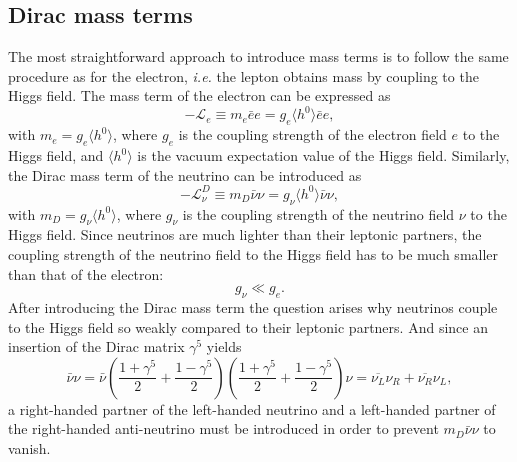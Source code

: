 \subsection{Dirac mass terms}
\label{sec:dirac}
The most straightforward approach to introduce mass terms is to follow the same procedure as for the electron, \textit{i.e.} the lepton obtains mass by coupling to the Higgs field. The mass term of the electron can be expressed as
\begin{equation}
  \label{eq:dme}
  -\mathcal{L}_{e} \equiv m_{e}\bar{e}e = g_{e}\langle      
  h^{0}\rangle \bar{e}e,
\end{equation}
with $m_{e} = g_{e} \langle h^{0}\rangle$, where $g_e$ is the coupling strength of the electron field $e$ to the Higgs field, and $\langle h^{0} \rangle$ is the vacuum expectation value of the Higgs field. Similarly, the Dirac mass term of the neutrino can be introduced as
\begin{equation}
\label{eq:dmnu}
-\mathcal{L}_{\nu}^{D} \equiv m_{D}\bar{\nu}\nu = g_{\nu} \langle h^{0} \rangle \bar{\nu}\nu,
\end{equation}
with $m_{D} = g_{\nu} \langle h^{0}\rangle$, where $g_\nu$ is the coupling strength of the neutrino field $\nu$ to the Higgs field. Since neutrinos are much lighter than their leptonic partners, the coupling strength of the neutrino field to the Higgs field has to be much smaller than that of the electron:
\begin{equation}
  \label{eq:gg}
  g_{\nu} \ll g_{e}.
\end{equation}
After introducing the Dirac mass term the question arises why neutrinos couple to the Higgs field so weakly compared to their leptonic partners. And since an insertion of the Dirac matrix $\gamma^{5}$ yields
\begin{equation}
  \label{eq:2psi}
  \bar{\nu}\nu = \bar{\nu}    
  \left(\frac{1+\gamma^5}{2}+\frac{1-\gamma^5}{2}\right)
  \left(\frac{1+\gamma^5}{2}+\frac{1-\gamma^5}{2}\right) \nu =
  \overline{\nu_{L}}\nu_{R}+\overline{\nu_{R}}\nu_{L},
\end{equation}
a right-handed partner of the left-handed neutrino and a left-handed partner of the right-handed anti-neutrino must be introduced in order to prevent $m_{D}\bar{\nu}\nu$ to vanish.

